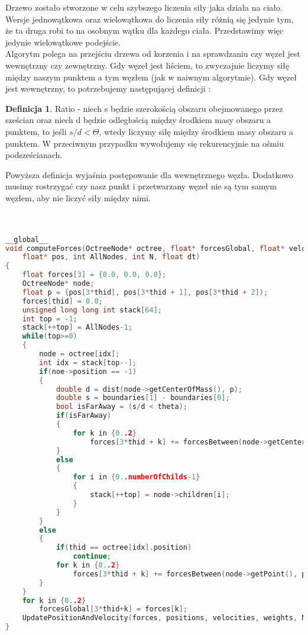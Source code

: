 \documentclass[14pt,twoside,a4paper]{article}
\theoremstyle{definition}
\newtheorem{definition}{Definicja}[section]
\begin{document}
Drzewo zostało stworzone w celu szybszego liczenia siły jaka działa na ciało.\\
Wersje jednowątkowa oraz wielowątkowa do liczenia siły różnią się jedynie tym, że ta druga robi to na osobnym wątku dla każdego ciała. Przedstawimy więc jedynie wielowątkowe podejście. \\
Algorytm polega na przejściu drzewa od korzenia i na sprawdzaniu czy węzeł jest wewnętrzny czy zewnętrzny. Gdy węzeł jest liściem, to zwyczajnie liczymy siłę między naszym punktem a tym węzłem (jak w naiwnym algorytmie). Gdy węzeł jest wewnętrzny, to potrzebujemy następującej definicji \cite{Aarseth}:

\theoremstyle{definition}
\begin{definition}{Ratio}
- niech s będzie szerokością obszaru obejmowanego przez sześcian oraz niech d będzie odległością między środkiem masy obszaru a punktem, to jeśli $s/d < \Theta$, wtedy liczymy siłę między środkiem masy obszaru a punktem. W przeciwnym przypadku wywołujemy się rekurencyjnie na ośmiu podsześcianach.
\end{definition}

Powyższa definicja wyjaśnia postępowanie dla wewnętrznego węzła. Dodatkowo musimy rostrzygać czy nasz punkt i przetwarzany węzeł nie są tym samym węzłem, aby nie liczyć siły między nimi.\\~\\~\\
\bigskip
\bigskip

\begin{lstlisting}[language=C++, frame=single, framerule=2pt, caption=Liczenie siły oddziałującej na ciało w układzie]
__global__
void computeForces(OctreeNode* octree, float* forcesGlobal, float* velocities, float* weights, 
	float* pos, int AllNodes, int N, float dt) 
{	
    float forces[3] = {0.0, 0.0, 0.0};
    OctreeNode* node;
    float p = {pos[3*thid], pos[3*thid + 1], pos[3*thid + 2]);
    forces[thid] = 0.0;
    unsigned long long int stack[64];
    int top = -1;
    stack[++top] = AllNodes-1;
    while(top>=0) 
    {
    	node = octree[idx];
        int idx = stack[top--];
        if(noe->position == -1)
        {
            double d = dist(node->getCenterOfMass(), p);
            double s = boundaries[1] - boundaries[0];
            bool isFarAway = (s/d < theta);
            if(isFarAway)
            {	
                for k in {0..2}
                    forces[3*thid + k] += forcesBetween(node->getCenterOfMass(), p);
            }
            else
            {
                for i in {0..numberOfChilds-1}
                {
                    stack[++top] = node->children[i];
                }
            }
        }
        else
        {
            if(thid == octree[idx].position) 
                continue;
            for k in {0..2}
                forces[3*thid + k] += forcesBetween(node->getPoint(), p);
        }	
    }
    for k in {0..2}
    	forcesGlobal[3*thid+k] = forces[k];
    UpdatePositionAndVelocity(forces, positions, velocities, weights, N, dt);
}
\end{lstlisting}
\end{document}
